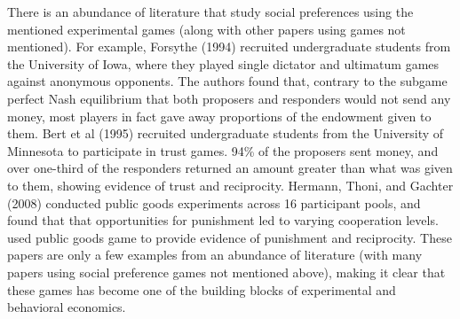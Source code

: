 \documentclass[12pt]{article}
\begin{document}
There is an abundance of literature that study social preferences using the mentioned experimental games (along with other papers using games not mentioned). For example, Forsythe (1994) recruited undergraduate students from the University of Iowa, where they played single dictator and ultimatum games against anonymous opponents. The authors found that, contrary to the subgame perfect Nash equilibrium that both proposers and responders would not send any money, most players in fact gave away proportions of the endowment given to them. Bert et al (1995) recruited undergraduate students from the University of Minnesota to participate in trust games. 94\% of the proposers sent money, and over one-third of the responders returned an amount greater than what was given to them, showing evidence of trust and reciprocity. Hermann, Thoni, and Gachter (2008) conducted public goods experiments across 16 participant pools, and found that that opportunities for punishment led to varying cooperation levels. used public goods game to provide evidence of punishment and reciprocity. These papers are only a few examples from an abundance of literature (with many papers using social preference games not mentioned above), making it clear that these games has become one of the building blocks of experimental and behavioral economics. 
 
\end{document}
